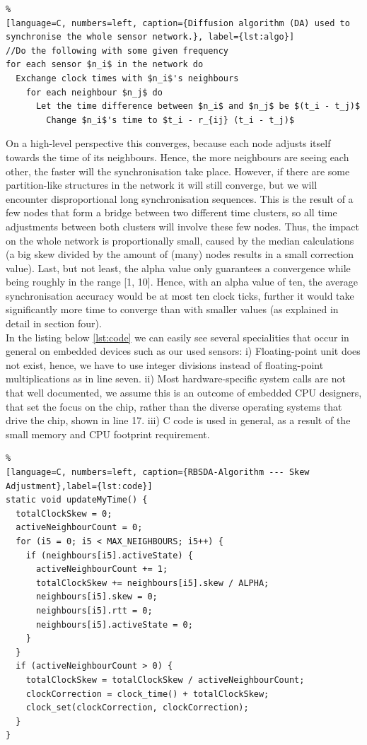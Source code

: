 \documentclass{llncs}
\begin{document}
\begin{lstlisting}%
[language=C, numbers=left, caption={Diffusion algorithm (DA) used to synchronise the whole sensor network.}, label={lst:algo}]
//Do the following with some given frequency
for each sensor $n_i$ in the network do
  Exchange clock times with $n_i$'s neighbours
    for each neighbour $n_j$ do
      Let the time difference between $n_i$ and $n_j$ be $(t_i - t_j)$
        Change $n_i$'s time to $t_i - r_{ij} (t_i - t_j)$
\end{lstlisting}
\noindent On a high-level perspective this converges, because each node adjusts itself towards the time of its neighbours. Hence, the more neighbours are seeing each other, the faster will the synchronisation take place. However, if there are some partition-like structures in the network it will still converge, but we will encounter disproportional long synchronisation sequences. This is the result of a few nodes that form a bridge between two different time clusters, so all time adjustments between both clusters will involve these few nodes. Thus, the impact on the whole network is proportionally small, caused by the median calculations (a big skew divided by the amount of (many) nodes results in a small correction value). Last, but not least, the alpha value only guarantees a convergence while being roughly in the range [1, 10]. Hence, with an alpha value of ten, the average synchronisation accuracy would be at most ten clock ticks, further it would take significantly more time to converge than with smaller values (as explained in detail in section four).\\
\indent In the listing below \ref{lst:code} we can easily see several specialities that occur in general on embedded devices such as our used sensors: i) Floating-point unit does not exist, hence, we have to use integer divisions instead of floating-point multiplications as in line seven. ii) Most hardware-specific system calls are not that well documented, we assume this is an outcome of embedded CPU designers, that set the focus on the chip, rather than the diverse operating systems that drive the chip, shown in line 17. iii) C code is used in general, as a result of the small memory and CPU footprint requirement.
\begin{lstlisting}%
[language=C, numbers=left, caption={RBSDA-Algorithm --- Skew Adjustment},label={lst:code}]
static void updateMyTime() {
  totalClockSkew = 0;
  activeNeighbourCount = 0;
  for (i5 = 0; i5 < MAX_NEIGHBOURS; i5++) {
    if (neighbours[i5].activeState) {
      activeNeighbourCount += 1;
      totalClockSkew += neighbours[i5].skew / ALPHA;
      neighbours[i5].skew = 0;
      neighbours[i5].rtt = 0;
      neighbours[i5].activeState = 0;
    }
  }
  if (activeNeighbourCount > 0) {
    totalClockSkew = totalClockSkew / activeNeighbourCount;
    clockCorrection = clock_time() + totalClockSkew;
    clock_set(clockCorrection, clockCorrection);
  }
}
\end{lstlisting}
\end{document}
